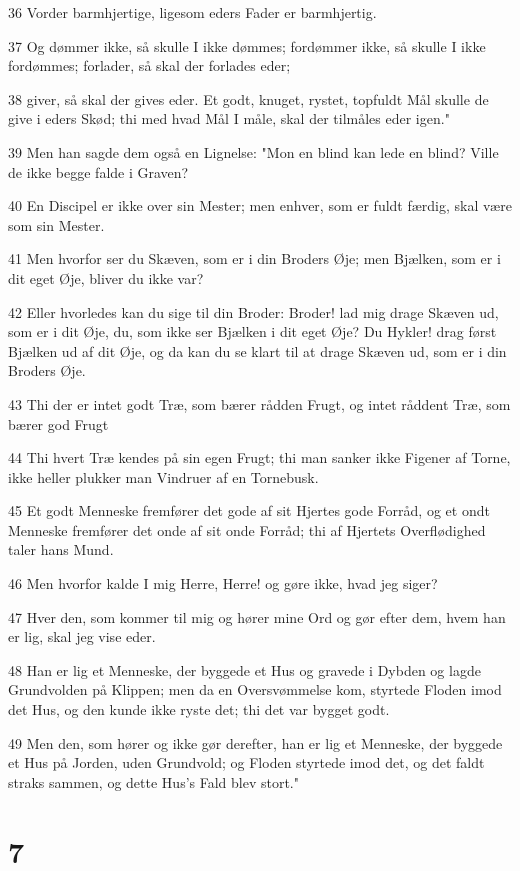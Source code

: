 \par 36 Vorder barmhjertige, ligesom eders Fader er barmhjertig.
\par 37 Og dømmer ikke, så skulle I ikke dømmes; fordømmer ikke, så skulle I ikke fordømmes; forlader, så skal der forlades eder;
\par 38 giver, så skal der gives eder. Et godt, knuget, rystet, topfuldt Mål skulle de give i eders Skød; thi med hvad Mål I måle, skal der tilmåles eder igen."
\par 39 Men han sagde dem også en Lignelse: "Mon en blind kan lede en blind? Ville de ikke begge falde i Graven?
\par 40 En Discipel er ikke over sin Mester; men enhver, som er fuldt færdig, skal være som sin Mester.
\par 41 Men hvorfor ser du Skæven, som er i din Broders Øje; men Bjælken, som er i dit eget Øje, bliver du ikke var?
\par 42 Eller hvorledes kan du sige til din Broder: Broder! lad mig drage Skæven ud, som er i dit Øje, du, som ikke ser Bjælken i dit eget Øje? Du Hykler! drag først Bjælken ud af dit Øje, og da kan du se klart til at drage Skæven ud, som er i din Broders Øje.
\par 43 Thi der er intet godt Træ, som bærer rådden Frugt, og intet råddent Træ, som bærer god Frugt
\par 44 Thi hvert Træ kendes på sin egen Frugt; thi man sanker ikke Figener af Torne, ikke heller plukker man Vindruer af en Tornebusk.
\par 45 Et godt Menneske fremfører det gode af sit Hjertes gode Forråd, og et ondt Menneske fremfører det onde af sit onde Forråd; thi af Hjertets Overflødighed taler hans Mund.
\par 46 Men hvorfor kalde I mig Herre, Herre! og gøre ikke, hvad jeg siger?
\par 47 Hver den, som kommer til mig og hører mine Ord og gør efter dem, hvem han er lig, skal jeg vise eder.
\par 48 Han er lig et Menneske, der byggede et Hus og gravede i Dybden og lagde Grundvolden på Klippen; men da en Oversvømmelse kom, styrtede Floden imod det Hus, og den kunde ikke ryste det; thi det var bygget godt.
\par 49 Men den, som hører og ikke gør derefter, han er lig et Menneske, der byggede et Hus på Jorden, uden Grundvold; og Floden styrtede imod det, og det faldt straks sammen, og dette Hus's Fald blev stort."

\chapter{7}

